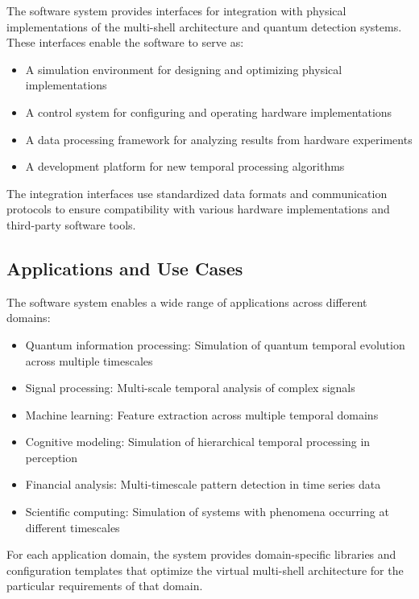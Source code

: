 \documentclass[12pt,letterpaper]{article}
\begin{document}
The software system provides interfaces for integration with physical implementations of the multi-shell architecture and quantum detection systems. These interfaces enable the software to serve as:

\begin{itemize}
    \item A simulation environment for designing and optimizing physical implementations
    \item A control system for configuring and operating hardware implementations
    \item A data processing framework for analyzing results from hardware experiments
    \item A development platform for new temporal processing algorithms
\end{itemize}

The integration interfaces use standardized data formats and communication protocols to ensure compatibility with various hardware implementations and third-party software tools.

\subsection{Applications and Use Cases}

The software system enables a wide range of applications across different domains:

\begin{itemize}
    \item Quantum information processing: Simulation of quantum temporal evolution across multiple timescales
    \item Signal processing: Multi-scale temporal analysis of complex signals
    \item Machine learning: Feature extraction across multiple temporal domains
    \item Cognitive modeling: Simulation of hierarchical temporal processing in perception
    \item Financial analysis: Multi-timescale pattern detection in time series data
    \item Scientific computing: Simulation of systems with phenomena occurring at different timescales
\end{itemize}

For each application domain, the system provides domain-specific libraries and configuration templates that optimize the virtual multi-shell architecture for the particular requirements of that domain.
\end{document}
